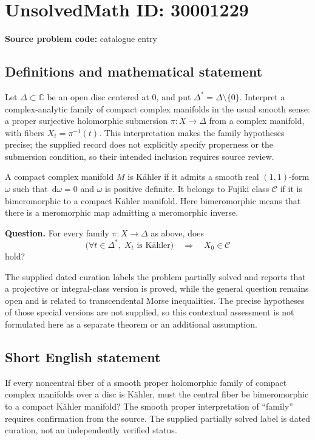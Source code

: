 \documentclass[11pt]{article}
\newcommand{\C}{\mathbb{C}}
\newcommand{\dd}{\,\mathrm{d}}
\begin{document}
\section*{UnsolvedMath ID: 30001229}
\textbf{Source problem code:} catalogue entry
\subsection{Definitions and mathematical statement}
Let \(\Delta\subset\C\) be an open disc centered at \(0\), and put \(\Delta^*=\Delta\setminus\{0\}\). Interpret a complex-analytic family of compact complex manifolds in the usual smooth sense: a proper surjective holomorphic submersion \(\pi:X\to\Delta\) from a complex manifold, with fibers \(X_t=\pi^{-1}(t)\). This interpretation makes the family hypotheses precise; the supplied record does not explicitly specify properness or the submersion condition, so their intended inclusion requires source review.

A compact complex manifold \(M\) is K\"ahler if it admits a smooth real \((1,1)\)-form \(\omega\) such that \(\dd\omega=0\) and \(\omega\) is positive definite. It belongs to Fujiki class \(\mathcal C\) if it is bimeromorphic to a compact K\"ahler manifold. Here bimeromorphic means that there is a meromorphic map admitting a meromorphic inverse.

\textbf{Question.} For every family \(\pi:X\to\Delta\) as above, does
\[
\bigl(\forall t\in\Delta^*,\;X_t\text{ is K\"ahler}\bigr)
\quad\Longrightarrow\quad X_0\in\mathcal C
\]
hold?

The supplied dated curation labels the problem partially solved and reports that a projective or integral-class version is proved, while the general question remains open and is related to transcendental Morse inequalities. The precise hypotheses of those special versions are not supplied, so this contextual assessment is not formulated here as a separate theorem or an additional assumption.
\subsection{Short English statement}
If every noncentral fiber of a smooth proper holomorphic family of compact complex manifolds over a disc is K\"ahler, must the central fiber be bimeromorphic to a compact K\"ahler manifold? The smooth proper interpretation of ``family'' requires confirmation from the source. The supplied partially solved label is dated curation, not an independently verified status.
\end{document}
